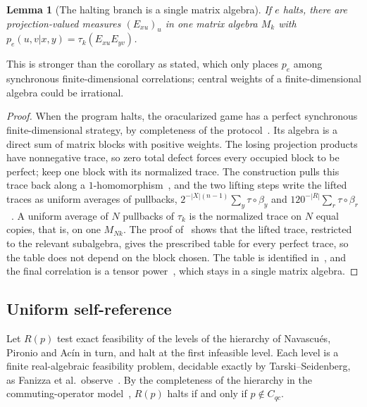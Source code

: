 \documentclass[11pt]{article}
\newtheorem{lemma}{Lemma}[section]
\theoremstyle{definition}
\theoremstyle{remark}
\begin{document}
\begin{lemma}[The halting branch is a single matrix algebra]\label{lem:matrix-branch}
If $e$ halts, there are projection-valued measures $(E_{xu})_u$ in one matrix algebra $M_k$ with $p_e(u,v|x,y)=\tau_k(E_{xu}E_{yv})$.
\end{lemma}

This is stronger than the corollary as stated, which only places $p_e$ among synchronous finite-dimensional correlations; central weights of a finite-dimensional algebra could be irrational.

\begin{proof}
When the program halts, the oracularized game has a perfect synchronous finite-dimensional strategy, by completeness of the protocol~\cite[Theorem~3.2, Lemma~4.1 and the proof of Theorem~9.15]{MastelSlofstra}. Its algebra is a direct sum of matrix blocks with positive weights. The losing projection products have nonnegative trace, so zero total defect forces every occupied block to be perfect; keep one block with its normalized trace. The construction pulls this trace back along a $1$-homomorphism~\cite[proof of Theorem~9.15]{MastelSlofstra}, and the two lifting steps write the lifted traces as uniform averages of pullbacks, $2^{-|X|(n-1)}\sum_y\tau\circ\beta_y$ and $120^{-|R|}\sum_r\tau\circ\beta_r$~\cite[proofs of Lemmas~9.4(b) and~9.8(d)]{MastelSlofstra}. A uniform average of $N$ pullbacks of $\tau_k$ is the normalized trace on $N$ equal copies, that is, on one $M_{Nk}$. The proof of~\cite[Proposition~9.12]{MastelSlofstra} shows that the lifted trace, restricted to the relevant subalgebra, gives the prescribed table for every perfect trace, so the table does not depend on the block chosen. The table is identified in~\cite[Proposition~7.4 and Theorem~9.14]{MastelSlofstra}, and the final correlation is a tensor power~\cite[Section~8, Proposition~9.2 and the proof of Corollary~9.16]{MastelSlofstra}, which stays in a single matrix algebra.
\end{proof}

\subsection{Uniform self-reference}

Let $R(p)$ test exact feasibility of the levels of the hierarchy of Navascu\'es, Pironio and Ac\'in in turn, and halt at the first infeasible level. Each level is a finite real-algebraic feasibility problem, decidable exactly by Tarski--Seidenberg, as Fanizza et al.\ observe~\cite[Section~2.3]{FanizzaEtAl}. By the completeness of the hierarchy in the commuting-operator model~\cite[Theorem~8]{NPA}, $R(p)$ halts if and only if $p\notin C_{qc}$.
\end{document}
